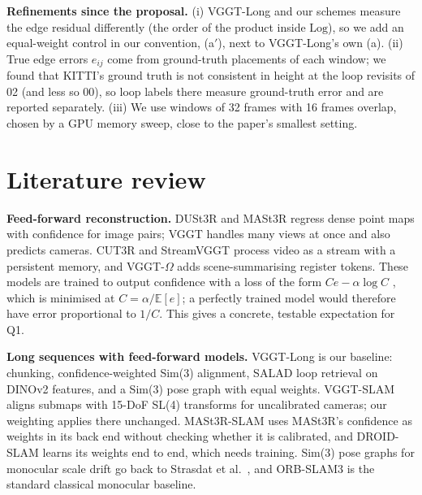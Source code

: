 \documentclass[11pt, a4paper]{article}
\begin{document}
\textbf{Refinements since the proposal.} (i) VGGT-Long and our schemes measure the edge residual differently (the order of
the product inside $\mathrm{Log}$), so we add an equal-weight control in our convention, (a$'$), next to VGGT-Long's own
(a). (ii) True edge errors $e_{ij}$ come from ground-truth placements of each window; we found that KITTI's ground truth
is not consistent in height at the loop revisits of 02 (and less so 00), so loop labels there measure ground-truth
error and are reported separately. (iii) We use windows of 32 frames with 16 frames overlap, chosen by a GPU memory
sweep, close to the paper's smallest setting.

\section{Literature review}

\textbf{Feed-forward reconstruction.} DUSt3R \cite{dust3r} and MASt3R \cite{mast3r} regress dense point maps with
confidence for image pairs; VGGT \cite{vggt} handles many views at once and also predicts cameras. CUT3R \cite{cut3r}
and StreamVGGT \cite{streamvggt} process video as a stream with a persistent memory, and VGGT-$\Omega$ \cite{vggtomega}
adds scene-summarising register tokens. These models are trained to output confidence with a loss of the form
$C e - \alpha \log C$ \cite{kendall}, which is minimised at $C = \alpha/\mathbb{E}[e]$; a perfectly trained model would
therefore have error proportional to $1/C$. This gives a concrete, testable expectation for Q1.

\textbf{Long sequences with feed-forward models.} VGGT-Long \cite{vggtlong} is our baseline: chunking, confidence-weighted
Sim(3) alignment, SALAD \cite{salad} loop retrieval on DINOv2 \cite{dinov2} features, and a Sim(3) pose graph with equal
weights. VGGT-SLAM \cite{vggtslam} aligns submaps with 15-DoF SL(4) transforms for uncalibrated cameras; our weighting
applies there unchanged. MASt3R-SLAM \cite{mast3rslam} uses MASt3R's confidence as weights in its back end without
checking whether it is calibrated, and DROID-SLAM \cite{droid} learns its weights end to end, which needs training. Sim(3)
pose graphs for monocular scale drift go back to Strasdat et al.~\cite{strasdat}, and ORB-SLAM3 \cite{orbslam3} is the
standard classical monocular baseline.
\end{document}
